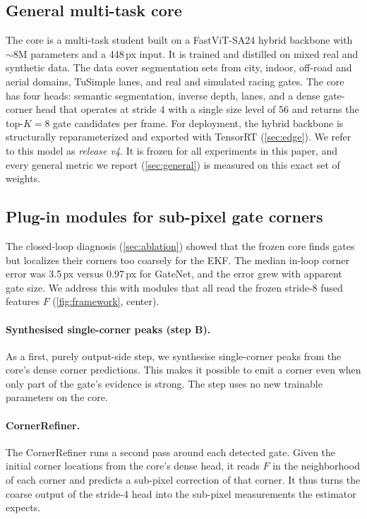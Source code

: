 \documentclass[10pt,twocolumn,letterpaper]{article}
\begin{document}
\subsection{General multi-task core}
\label{sec:core}
The core is a multi-task student built on a FastViT-SA24 hybrid backbone with $\sim$8M parameters and a 448\,px input. It is trained and distilled on mixed real and synthetic data. The data cover segmentation sets from city, indoor, off-road and aerial domains, TuSimple lanes, and real and simulated racing gates. The core has four heads: semantic segmentation, inverse depth, lanes, and a dense gate-corner head that operates at stride 4 with a single size level of 56 and returns the top-$K{=}8$ gate candidates per frame. For deployment, the hybrid backbone is structurally reparameterized and exported with TensorRT (\cref{sec:edge}). We refer to this model as \emph{release v4}. It is frozen for all experiments in this paper, and every general metric we report (\cref{sec:general}) is measured on this exact set of weights.

\subsection{Plug-in modules for sub-pixel gate corners}
\label{sec:modules}
The closed-loop diagnosis (\cref{sec:ablation}) showed that the frozen core finds gates but localizes their corners too coarsely for the EKF. The median in-loop corner error was 3.5\,px versus 0.97\,px for GateNet, and the error grew with apparent gate size. We address this with modules that all read the frozen stride-8 fused features $F$ (\cref{fig:framework}, center).

\paragraph{Synthesised single-corner peaks (step B).}
As a first, purely output-side step, we synthesise single-corner peaks from the core's dense corner predictions. This makes it possible to emit a corner even when only part of the gate's evidence is strong. The step uses no new trainable parameters on the core.

\paragraph{CornerRefiner.}
The CornerRefiner runs a second pass around each detected gate. Given the initial corner locations from the core's dense head, it reads $F$ in the neighborhood of each corner and predicts a sub-pixel correction of that corner. It thus turns the coarse output of the stride-4 head into the sub-pixel measurements the estimator expects.
\end{document}
